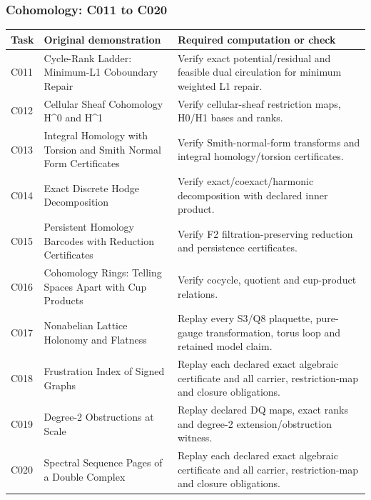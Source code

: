 \documentclass[
  11pt,
]{article}
\begin{document}
\subsubsection{Cohomology: C011 to C020}\label{cohomology-c011-to-c020}

\begin{longtable}[]{@{}
  >{\raggedright\arraybackslash}p{}
  >{\raggedright\arraybackslash}p{}
  >{\raggedright\arraybackslash}p{}@{}}
\toprule\noalign{}
\begin{minipage}[b]{\linewidth}\raggedright
Task
\end{minipage} & \begin{minipage}[b]{\linewidth}\raggedright
Original demonstration
\end{minipage} & \begin{minipage}[b]{\linewidth}\raggedright
Required computation or check
\end{minipage} \\
\midrule\noalign{}
\endhead
\bottomrule\noalign{}
\endlastfoot
C011 & Cycle-Rank Ladder: Minimum-L1 Coboundary Repair & Verify exact
potential/residual and feasible dual circulation for minimum weighted L1
repair. \\
C012 & Cellular Sheaf Cohomology H\^{}0 and H\^{}1 & Verify
cellular-sheaf restriction maps, H0/H1 bases and ranks. \\
C013 & Integral Homology with Torsion and Smith Normal Form Certificates
& Verify Smith-normal-form transforms and integral homology/torsion
certificates. \\
C014 & Exact Discrete Hodge Decomposition & Verify
exact/coexact/harmonic decomposition with declared inner product. \\
C015 & Persistent Homology Barcodes with Reduction Certificates & Verify
F2 filtration-preserving reduction and persistence certificates. \\
C016 & Cohomology Rings: Telling Spaces Apart with Cup Products & Verify
cocycle, quotient and cup-product relations. \\
C017 & Nonabelian Lattice Holonomy and Flatness & Replay every S3/Q8
plaquette, pure-gauge transformation, torus loop and retained model
claim. \\
C018 & Frustration Index of Signed Graphs & Replay each declared exact
algebraic certificate and all carrier, restriction-map and closure
obligations. \\
C019 & Degree-2 Obstructions at Scale & Replay declared DQ maps, exact
ranks and degree-2 extension/obstruction witness. \\
C020 & Spectral Sequence Pages of a Double Complex & Replay each
declared exact algebraic certificate and all carrier, restriction-map
and closure obligations. \\
\end{longtable}
\end{document}
